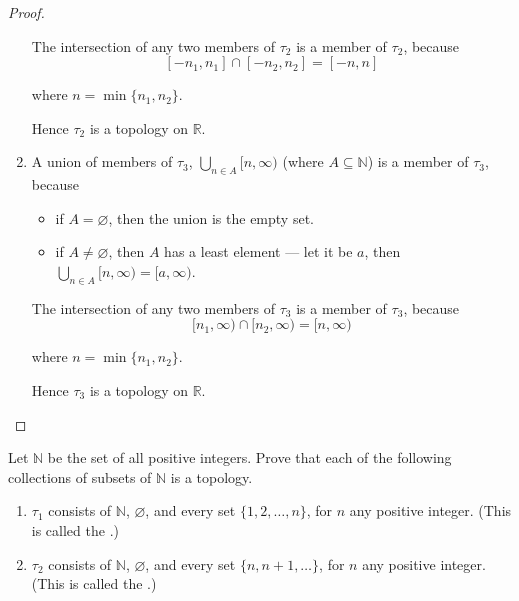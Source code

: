\begin{proof}
\begin{enumerate}[label={(\roman*)}]
              The intersection of any two members of $\tau_{2}$ is a member of $\tau_{2}$, because
              \[
                  [-n_{1}, n_{1}]\cap [-n_{2}, n_{2}] = [-n, n]
              \]

              where $n = \min\{ n_{1}, n_{2} \}$.

              Hence $\tau_{2}$ is a topology on $\mathbb{R}$.
        \item A union of members of $\tau_{3}$, $\bigcup_{n\in A} [n, \infty)$ (where $A\subseteq \mathbb{N}$) is a member of $\tau_{3}$, because
              \begin{itemize}
                  \item if $A = \varnothing$, then the union is the empty set.
                  \item if $A\ne\varnothing$, then $A$ has a least element --- let it be $a$, then $\bigcup_{n\in A} [n, \infty) = [a, \infty)$.
              \end{itemize}

              The intersection of any two members of $\tau_{3}$ is a member of $\tau_{3}$, because
              \[
                  [n_{1}, \infty) \cap [n_{2}, \infty) = [n, \infty)
              \]

              where $n = \min\{ n_{1}, n_{2} \}$.

              Hence $\tau_{3}$ is a topology on $\mathbb{R}$.
    \end{enumerate}
\end{proof}
\newpage

\begin{exercise}
    Let $\mathbb{N}$ be the set of all positive integers. Prove that each of the following collections of subsets of $\mathbb{N}$ is a topology.
    \begin{enumerate}[label={(\roman*)}]
        \item $\tau_{1}$ consists of $\mathbb{N}$, $\varnothing$, and every set $\{ 1, 2, \ldots, n \}$, for $n$ any positive integer. (This is called the {\color{red}{initial segment topology}}.)
        \item $\tau_{2}$ consists of $\mathbb{N}$, $\varnothing$, and every set $\{ n, n+1, \ldots \}$, for $n$ any positive integer. (This is called the {\color{red}{final segment topology}}.)
    \end{enumerate}
\end{exercise}

